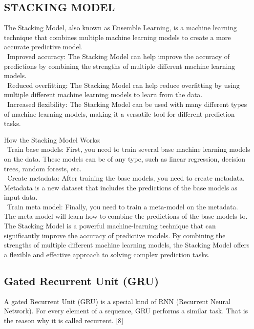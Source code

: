 \documentclass{ieeeojies}
\begin{document}
\subsection{STACKING MODEL} 
The Stacking Model, also known as Ensemble Learning, is a machine learning technique that combines multiple machine learning models to create a more accurate predictive model. \\
    \indent\textbullet\ Improved accuracy: The Stacking Model can help improve the accuracy of predictions by combining the strengths of multiple different machine learning models. \\
    \indent\textbullet\ Reduced overfitting: The Stacking Model can help reduce overfitting by using multiple different machine learning models to learn from the data. \\
    \indent\textbullet\ Increased flexibility: The Stacking Model can be used with many different types of machine learning models, making it a versatile tool for different prediction tasks.

How the Stacking Model Works:
\\
   \indent\textbullet\ Train base models: First, you need to train several base machine learning models on the data. These models can be of any type, such as linear regression, decision trees, random forests, etc. \\
   \indent\textbullet\ Create metadata: After training the base models, you need to create metadata. Metadata is a new dataset that includes the predictions of the base models as input data. \\
   \indent\textbullet\ Train meta model: Finally, you need to train a meta-model on the metadata. The meta-model will learn how to combine the predictions of the base models to.\\
The Stacking Model is a powerful machine-learning technique that can significantly improve the accuracy of predictive models. By combining the strengths of multiple different machine learning models, the Stacking Model offers a flexible and effective approach to solving complex prediction tasks.

\subsection{Gated Recurrent Unit (GRU)} 
A gated Recurrent Unit (GRU) is a special kind of RNN (Recurrent Neural Network). For every element of a sequence, GRU performs a similar task. That is the reason why it is called recurrent. [8]
\end{document}
